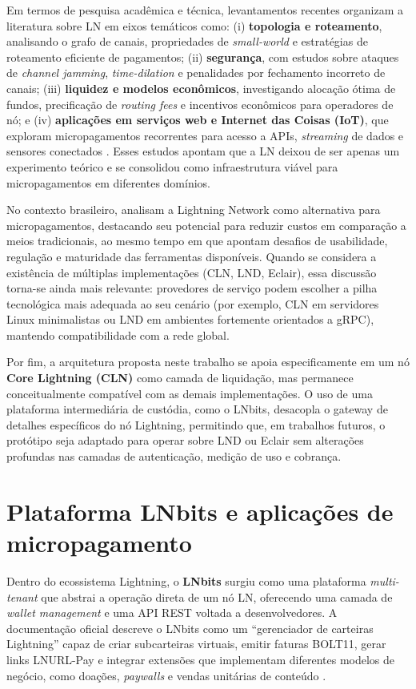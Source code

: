\documentclass[openright]{normas-utf-tex}
\begin{document}
Em termos de pesquisa acadêmica e técnica, levantamentos recentes organizam a literatura sobre LN em eixos temáticos como: (i) \textbf{topologia e roteamento}, analisando o grafo de canais, propriedades de \textit{small-world} e estratégias de roteamento eficiente de pagamentos; (ii) \textbf{segurança}, com estudos sobre ataques de \textit{channel jamming}, \textit{time-dilation} e penalidades por fechamento incorreto de canais; (iii) \textbf{liquidez e modelos econômicos}, investigando alocação ótima de fundos, precificação de \textit{routing fees} e incentivos econômicos para operadores de nó; e (iv) \textbf{aplicações em serviços web e Internet das Coisas (IoT)}, que exploram micropagamentos recorrentes para acesso a APIs, \textit{streaming} de dados e sensores conectados \cite{rodriguez2024survey,lnsecurity}. Esses estudos apontam que a LN deixou de ser apenas um experimento teórico e se consolidou como infraestrutura viável para micropagamentos em diferentes domínios.

No contexto brasileiro,  analisam a Lightning Network como alternativa para micropagamentos, destacando seu potencial para reduzir custos em comparação a meios tradicionais, ao mesmo tempo em que apontam desafios de usabilidade, regulação e maturidade das ferramentas disponíveis. Quando se considera a existência de múltiplas implementações (CLN, LND, Eclair), essa discussão torna-se ainda mais relevante: provedores de serviço podem escolher a pilha tecnológica mais adequada ao seu cenário (por exemplo, CLN em servidores Linux minimalistas ou LND em ambientes fortemente orientados a gRPC), mantendo compatibilidade com a rede global.

Por fim, a arquitetura proposta neste trabalho se apoia especificamente em um nó \textbf{Core Lightning (CLN)} como camada de liquidação, mas permanece conceitualmente compatível com as demais implementações. O uso de uma plataforma intermediária de custódia, como o LNbits, desacopla o gateway de detalhes específicos do nó Lightning, permitindo que, em trabalhos futuros, o protótipo seja adaptado para operar sobre LND ou Eclair sem alterações profundas nas camadas de autenticação, medição de uso e cobrança.

\section{Plataforma LNbits e aplicações de micropagamento}

Dentro do ecossistema Lightning, o \textbf{LNbits} surgiu como uma plataforma \textit{multi-tenant} que abstrai a operação direta de um nó LN, oferecendo uma camada de \textit{wallet management} e uma API REST voltada a desenvolvedores. A documentação oficial descreve o LNbits como um ``gerenciador de carteiras Lightning'' capaz de criar subcarteiras virtuais, emitir faturas BOLT11, gerar links LNURL-Pay e integrar extensões que implementam diferentes modelos de negócio, como doações, \textit{paywalls} e vendas unitárias de conteúdo \cite{lnbitsdocs}.
\end{document}
